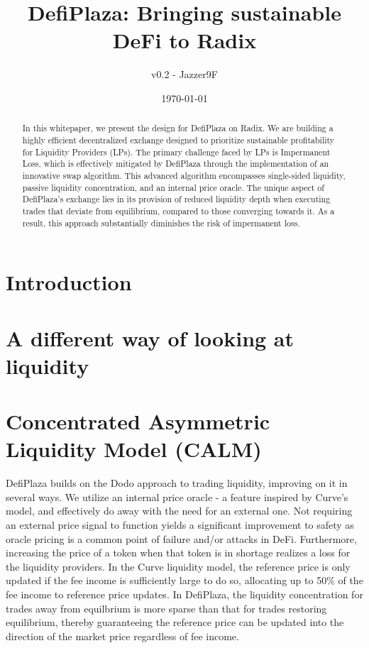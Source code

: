 \documentclass [10pt, twoside] {article}
\newcommand{\version}{{v0.2}}
\begin{document}
\title{DefiPlaza: Bringing sustainable DeFi to Radix}
\author {\version { }- Jazzer9F}

\date{\today}

\maketitle

\begin{abstract}
In this whitepaper, we present the design for DefiPlaza on Radix. We are building a highly efficient decentralized exchange designed to prioritize sustainable profitability for Liquidity Providers (LPs). The primary challenge faced by LPs is Impermanent Loss, which is effectively mitigated by DefiPlaza through the implementation of an innovative swap algorithm. This advanced algorithm encompasses single-sided liquidity, passive liquidity concentration, and an internal price oracle. The unique aspect of DefiPlaza's exchange lies in its provision of reduced liquidity depth when executing trades that deviate from equilibrium, compared to those converging towards it. As a result, this approach substantially diminishes the risk of impermanent loss.
\end{abstract}


\section{Introduction}

\section{A different way of looking at liquidity}



\section{Concentrated Asymmetric Liquidity Model (CALM)}
DefiPlaza builds on the Dodo approach to trading liquidity, improving on it in several ways. We utilize an internal price oracle - a feature inspired by Curve's model, and effectively do away with the need for an external one. Not requiring an external price signal to function yields a significant improvement to safety as oracle pricing is a common point of failure and/or attacks in DeFi. Furthermore, increasing the price of a token when that token is in shortage realizes a loss for the liquidity providers. In the Curve liquidity model, the reference price is only updated if the fee income is sufficiently large to do so, allocating up to 50\% of the fee income to reference price updates. In DefiPlaza, the liquidity concentration for trades away from equilbrium is more sparse than that for trades restoring equilibrium, thereby guaranteeing the reference price can be updated into the direction of the market price regardless of fee income. 
\end{document}
